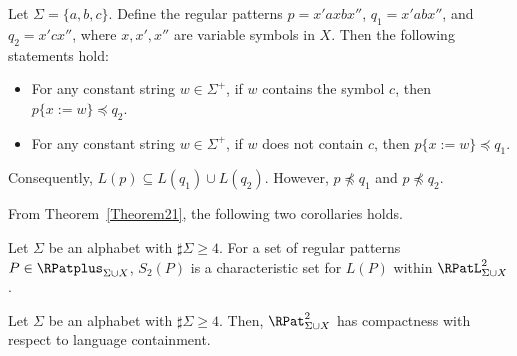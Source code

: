 \begin{ex}
    {\color{black}
    Let $\Sigma = \{a,b,c\}$.
    Define the regular patterns $p = x'axbx''$, $q_{1} = x'abx''$, and $q_{2} = x'cx''$,
    where $x,x',x''$ are variable symbols in $X$.
    Then the following statements hold:
    \begin{itemize}
    \item[(1)] For any constant string $w \in \Sigma^{+}$, if $w$ contains the symbol $c$, then $p \{x:=w\} \preceq q_{2}$.
    \item[(2)]  For any constant string $w \in \Sigma^{+}$, if $w$ does not contain $c$, then  $p\{x:=w\} \preceq q_{1}$.
    \end{itemize}
    Consequently, $L(p) \subseteq L(q_{1}) \cup L(q_{2})$.
    However, $p \not\preceq q_{1}$ and $p \not\preceq q_{2}$.}
\end{ex}

From Theorem~\ref{Theorem21}, 
the following two corollaries holds.

\begin{col}
    {\color{black} Let $\Sigma$ be an alphabet with $\sharp\Sigma \geq 4$.
    For a set of regular patterns $P \in \RPatplus_{\Sigma\cup X}$,}
    $S_{2}(P)$ is a characteristic set for $L(P)$ within {\color{black}$\RPatL^{2}_{\Sigma\cup X}$}.
\end{col}

\begin{col}
    {\color{black} Let $\Sigma$ be an alphabet with $\sharp\Sigma \geq 4$}.
Then, {\color{black}$\RPat^{2}_{\Sigma\cup X}$} has compactness with respect to {\color{black} language} containment.
\end{col}
